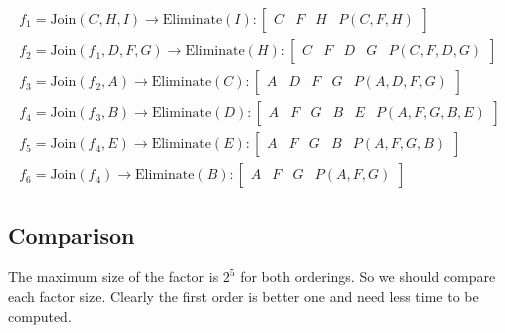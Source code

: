 \documentclass[en]{university}
\begin{document}
\begin{align*}
    f_1 = \text{Join} (C, H, I) \rightarrow \text{Eliminate} (I) : \begin{bmatrix}
        C & F & H & P(C, F, H)
    \end{bmatrix} \\
    f_2 = \text{Join} (f_1, D, F, G) \rightarrow \text{Eliminate} (H) : \begin{bmatrix}
        C & F & D & G & P(C, F, D, G)
    \end{bmatrix} \\
    f_3 = \text{Join} (f_2, A) \rightarrow \text{Eliminate} (C) : \begin{bmatrix}
        A & D & F & G & P(A, D, F, G)
    \end{bmatrix} \\
    f_4 = \text{Join} (f_3, B) \rightarrow \text{Eliminate} (D) : \begin{bmatrix}
        A & F & G & B & E & P(A, F, G, B, E)
    \end{bmatrix} \\
    f_5 = \text{Join} (f_4, E) \rightarrow \text{Eliminate} (E) : \begin{bmatrix}
        A & F & G & B & P(A, F, G, B)
    \end{bmatrix} \\
    f_6 = \text{Join} (f_4) \rightarrow \text{Eliminate} (B) : \begin{bmatrix}
        A & F & G & P(A, F, G)
    \end{bmatrix}
\end{align*}

\subsection{Comparison}

The maximum size of the factor is $2^5$ for both orderings. So we should compare each factor size. Clearly 
the first order is better one and need less time to be computed.

\section{}

\subsection{}
\end{document}
